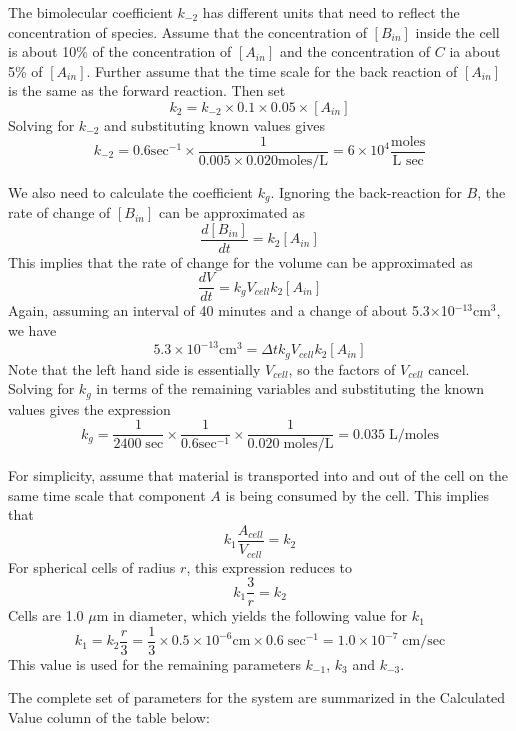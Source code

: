 \documentclass[12pt]{article}
\begin{document}
The bimolecular coefficient $k_{-2}$ has different units that need to reflect the concentration
of species. Assume that the concentration of $[B_{in}]$ inside the cell is about 10\% of the concentration
of $[A_{in}]$ and the concentration of $C$ ia about 5\% of $[A_{in}]$. Further assume that the time scale for the
back reaction of $[A_{in}]$ is the same as the forward reaction. Then set
\[
k_2 = k_{-2}\times 0.1\times 0.05\times [A_{in}]
\]
Solving for $k_{-2}$ and substituting known values gives
\[
k_{-2} = 0.6\mbox{sec}^{-1}\times\frac{1}{ 0.005\times 0.020 \mbox{moles/L}}=6\times 10^4
\frac{\mbox{moles}}{\mbox{L sec}}
\]

We also need to calculate the coefficient $k_g$.
Ignoring the back-reaction for $B$, the rate of change of $[B_{in}]$ can be approximated as
\[
\frac{d[B_{in}]}{dt} = k_2 [A_{in}]
\]
This implies that the rate of change for the volume can be approximated as
\[
\frac{dV}{dt} = k_g V_{cell}k_2 [A_{in}]
\]
Again, assuming an interval of 40 minutes and a change of about 5.3$\times$10$^{-13}$cm$^3$, we have
\[
5.3\times 10^{-13}\mbox{cm}^3 = \Delta t k_g V_{cell}k_2 [A_{in}]
\]
Note that the left hand side is essentially $V_{cell}$, so the factors of $V_{cell}$ cancel.
Solving for $k_g$ in terms of the remaining variables and substituting the known values gives
the expression
\[
k_g = \frac{1}{2400\;\mbox{sec}} \times\frac{1}{0.6\mbox{sec}^{-1}}\times\frac{1}{0.020\;\mbox{moles/L}}
=0.035\;\mbox{L/moles}
\]

For simplicity, assume that material is transported into and out of the cell on the same time scale
that component $A$ is being consumed by the cell. This implies that
\[
k_1\frac{A_{cell}}{V_{cell}} = k_2
\]
For spherical cells of radius $r$, this expression reduces to
\[
k_1\frac{3}{r} = k_2
\]
Cells are 1.0 $\mu$m in diameter, which yields the following value for $k_1$
\[
k_1 = k_2\frac{r}{3} = \frac{1}{3}\times 0.5\times 10^{-6}\mbox{cm}\times 0.6\;\mbox{sec}^{-1}=1.0\times
10^{-7}\;\mbox{cm/sec} 
\]
This value is used for the remaining parameters $k_{-1}$, $k_3$ and $k_{-3}$.

The complete set of parameters for the system are summarized in the Calculated Value column
of the table below:
\end{document}
